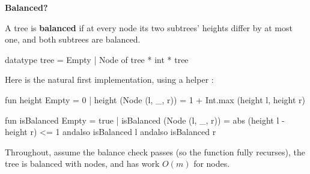 \newpage
{}

\textbf{Balanced?}

A tree is \textbf{balanced} if at every node its two subtrees' heights differ by
at most one, and both subtrees are balanced.
\begin{codeblock}
  datatype tree = Empty | Node of tree * int * tree
\end{codeblock}

Here is the natural first implementation, using a helper :
\begin{codeblock}
  fun height Empty = 0
    | height (Node (l, _, r)) = 1 + Int.max (height l, height r)

  fun isBalanced Empty = true
    | isBalanced (Node (l, _, r)) =
        abs (height l - height r) <= 1
        andalso isBalanced l
        andalso isBalanced r
\end{codeblock}

Throughout, assume the balance check passes (so the function fully recurses),
the tree is balanced with  nodes, and  has work $O(m)$
for  nodes.

